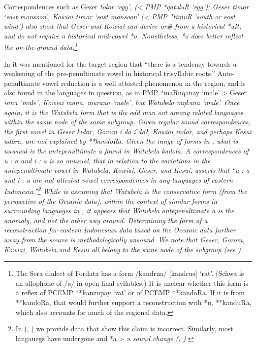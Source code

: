 Correspondences such as Geser \it{tolor} ‘egg’,
(< PMP *qatəluR ‘egg’); Geser \it{timor} ‘east monsoon’,
Kowiai \it{timor} ‘east monsoon’ (< PMP *timuR ‘south or east
wind’) also show that Geser
and Kowiai can derive \it{or{\#}} from a historical *uR,
and do not require a historical mid-vowel *o.
Nonetheless, *o does better reflect the on-the-ground data.\footnote{
		The Sera dialect of Fordata has a form /kandrua/ [kandruə] ‘rat’.
		(Schwa is an allophone of /a/ in open final syllables.) It is
		unclear whether this form is a reflex of PCEMP **kanzupay ‘rat’
		or of PCEMP **kandoRa.
		If it is from **kandoRa,
		that would further support a reconstruction with *u,
		**kanduRa, which also accounts for much of the regional data.}

In  it was mentioned for the target region that “there
is a tendency towards a weakening of the pre-penultimate vowel
in historical trisyllabic roots.” Ante-penultimate vowel reduction
is a well attested phenomenon in the region,
and is also found in the languages in question,
as in PMP *maRuqanay ‘male’ > Geser \it{rana} ‘male’,
Kowiai \it{mana, murana} ‘male’,
but Watubela \it{mŋkana} ‘male’.
Once again, it is the Watubela form that is the odd man out among
related languages within the same node of the same subgroup.
Given regular sound correspondences,
the first vowel in Geser \it{kidor},
Gorom \it{iˈdo {\tl} iˈdoʔ},
Kowiai \it{indor}, and perhaps Kesui \it{udora},
are not explained by **kandoRa.
Given the range of forms in ,
what is unusual is the antepenultimate \it{a} found in Watubela \it{kadola}.
A correspondences of \it{u : a}
and \it{i : a} is so unusual,
that in relation to the variations in the antepenultimate vowel
in Watubela, Kowiai, Geser, and Kesui, \citet[268,
footnote 6]{Blust2012b} asserts that “\it{u : a}
and \it{i : a} are not attested vowel correspondences in any
languages of eastern Indonesia.”\footnote{
		In  (, )
		we provide data that show this claim is incorrect.
		Similarly, most  langauegs have undergone
		and *a > \it{u} sound change (, ).}
While \citeauthor{Blust2012b}
is assuming that Watubela is the conservative form (from the
perspective of the Oceanic data),
within the context of similar forms in surrounding languages
in , it appears that Watubela antepenultimate \it{a} is the anomaly,
and not the other way around.
Determining the form of a reconstruction for eastern Indonesian
data based on the Oceanic data further away from the source is methodologically unsound.
We note that Geser,
Gorom, Kowiai, Watubela and Kesui all belong to the same  node of the  subgroup (see ).

